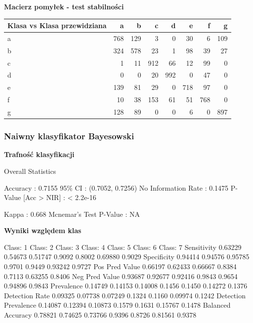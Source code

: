 \documentclass[11pt]{article} %
\begin{document}
\textbf{Macierz pomyłek - test stabilności}

\begin{center}
    \begin{tabular}{ | l | r | r | r | r | r | r | r | }
    \hline
 Klasa vs Klasa przewidziana &  a &  b &  c &  d &  e &  f &  g \\ \hline
a & 768 & 129 &  3 &  0 & 30  & 6 & 109 \\
b & 324 & 578 & 23 &  1 & 98 & 39 & 27 \\
c &  1 & 11 & 912 & 66 & 12 & 99 &  0 \\
d &  0  & 0 & 20 & 992 &  0 & 47 &  0 \\
e & 139 & 81 & 29 &  0 & 718 & 97 &  0 \\
f & 10 & 38 & 153 & 61 & 51 & 768 &  0 \\
g & 128 & 89 &  0 &  0 &  6  & 0 & 897 \\ \hline
    \end{tabular}
\end{center}

\subsubsection{Naiwny klasyfikator Bayesowski}

\textbf{Trafność klasyfikacji}

    Overall Statistics
                                          
               Accuracy : 0.7155          
                 95\% CI : (0.7052, 0.7256)
    No Information Rate : 0.1475          
    P-Value [Acc > NIR] : < 2.2e-16       
                                          
                  Kappa : 0.668           
 Mcnemar's Test P-Value : NA 

\textbf{Wyniki względem klas}

Class: 1 Class: 2 Class: 3 Class: 4 Class: 5 Class: 6 Class: 7
Sensitivity           0.63229  0.54673  0.51747   0.9092   0.8002  0.69880   0.9029
Specificity           0.94414  0.94576  0.95785   0.9701   0.9449  0.93242   0.9727
Pos Pred Value        0.66197  0.62433  0.66667   0.8384   0.7113  0.63255   0.8406
Neg Pred Value        0.93687  0.92677  0.92416   0.9843   0.9654  0.94896   0.9843
Prevalence            0.14749  0.14153  0.14008   0.1456   0.1450  0.14272   0.1376
Detection Rate        0.09325  0.07738  0.07249   0.1324   0.1160  0.09974   0.1242
Detection Prevalence  0.14087  0.12394  0.10873   0.1579   0.1631  0.15767   0.1478
Balanced Accuracy     0.78821  0.74625  0.73766   0.9396   0.8726  0.81561   0.9378
\end{document}
